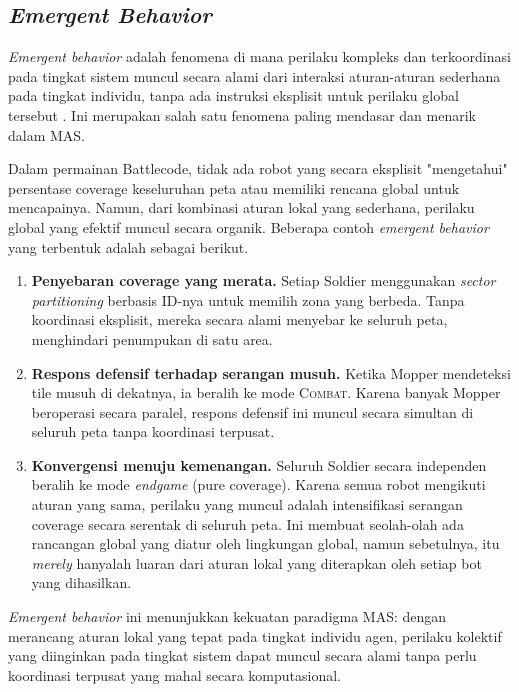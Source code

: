 \subsection{\textit{Emergent Behavior}}

\textit{Emergent behavior} adalah fenomena di mana perilaku kompleks dan terkoordinasi pada tingkat sistem muncul secara alami dari interaksi aturan-aturan sederhana pada tingkat individu, tanpa ada instruksi eksplisit untuk perilaku global tersebut \cite{wooldridge2009introduction}. Ini merupakan salah satu fenomena paling mendasar dan menarik dalam MAS.

Dalam permainan Battlecode, tidak ada robot yang secara eksplisit "mengetahui" persentase coverage keseluruhan peta atau memiliki rencana global untuk mencapainya. Namun, dari kombinasi aturan lokal yang sederhana, perilaku global yang efektif muncul secara organik. Beberapa contoh \textit{emergent behavior} yang terbentuk adalah sebagai berikut.

\begin{enumerate}
  \item \textbf{Penyebaran coverage yang merata.} Setiap Soldier menggunakan \textit{sector partitioning} berbasis ID-nya untuk memilih zona yang berbeda. Tanpa koordinasi eksplisit, mereka secara alami menyebar ke seluruh peta, menghindari penumpukan di satu area.

  \item \textbf{Respons defensif terhadap serangan musuh.} Ketika Mopper mendeteksi tile musuh di dekatnya, ia beralih ke mode \textsc{Combat}. Karena banyak Mopper beroperasi secara paralel, respons defensif ini muncul secara simultan di seluruh peta tanpa koordinasi terpusat.

  \item \textbf{Konvergensi menuju kemenangan.} Seluruh Soldier secara independen beralih ke mode \textit{endgame} (pure coverage). Karena semua robot mengikuti aturan yang sama, perilaku yang muncul adalah intensifikasi serangan coverage secara serentak di seluruh peta. Ini membuat seolah-olah ada rancangan global yang diatur oleh lingkungan global, namun sebetulnya, itu \textit{merely} hanyalah luaran dari aturan lokal yang diterapkan oleh setiap bot yang dihasilkan.
\end{enumerate}

\textit{Emergent behavior} ini menunjukkan kekuatan paradigma MAS: dengan merancang aturan lokal yang tepat pada tingkat individu agen, perilaku kolektif yang diinginkan pada tingkat sistem dapat muncul secara alami tanpa perlu koordinasi terpusat yang mahal secara komputasional.

